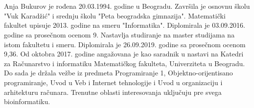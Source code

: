 \documentclass[a4paper, 12pt]{article}
\begin{document}
\\
\\
Anja Bukurov je rođena 20.03.1994. godine u Beogradu. Završila je osnovnu školu "Vuk Karadžić" i srednju školu "Peta beogradska gimnazija". Matematički fakultet upisuje 2013. godine na smeru "Informatika". Diplomirala je 03.09.2016. godine sa prosečnom ocenom 9. Nastavlja studiranje na master studijama na istom fakultetu i smeru. Diplomirala je 26.09.2019. godine sa prosečnom ocenom 9,36. Od oktobra 2017. godine angažovana je kao saradnik u nastavi na Katedri za Računarstvo i informatiku Matematičkog fakulteta, Univerziteta u Beogradu. Do sada je držala vežbe iz predmeta Programiranje 1, Objektno-orijentisano programiranje, Uvod u Veb i Internet tehnologije i Uvod u organizaciju i arhitekturu računara. Trenutne oblasti interesovanja uključuju pre svega bioinformatiku. 
\end{document}
